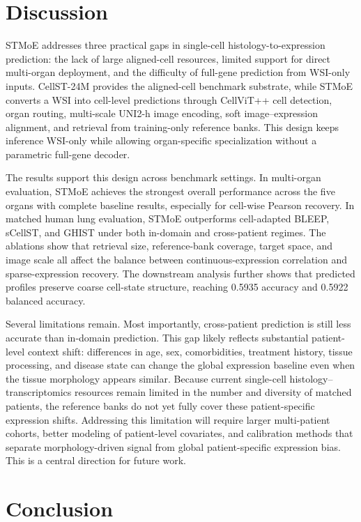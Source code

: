\documentclass[sigconf]{acmart}
\newcommand{\method}{STMoE\xspace}
\begin{document}
\section{Discussion}

\method{} addresses three practical gaps in single-cell histology-to-expression prediction: the lack of large aligned-cell resources, limited support for direct multi-organ deployment, and the difficulty of full-gene prediction from WSI-only inputs. CellST-24M provides the aligned-cell benchmark substrate, while \method{} converts a WSI into cell-level predictions through CellViT++ cell detection, organ routing, multi-scale UNI2-h image encoding, soft image--expression alignment, and retrieval from training-only reference banks. This design keeps inference WSI-only while allowing organ-specific specialization without a parametric full-gene decoder.

The results support this design across benchmark settings. In multi-organ evaluation, \method{} achieves the strongest overall performance across the five organs with complete baseline results, especially for cell-wise Pearson recovery. In matched human lung evaluation, \method{} outperforms cell-adapted BLEEP, sCellST, and GHIST under both in-domain and cross-patient regimes. The ablations show that retrieval size, reference-bank coverage, target space, and image scale all affect the balance between continuous-expression correlation and sparse-expression recovery. The downstream analysis further shows that predicted profiles preserve coarse cell-state structure, reaching 0.5935 accuracy and 0.5922 balanced accuracy.

Several limitations remain. Most importantly, cross-patient prediction is still less accurate than in-domain prediction. This gap likely reflects substantial patient-level context shift: differences in age, sex, comorbidities, treatment history, tissue processing, and disease state can change the global expression baseline even when the tissue morphology appears similar. Because current single-cell histology--transcriptomics resources remain limited in the number and diversity of matched patients, the reference banks do not yet fully cover these patient-specific expression shifts. Addressing this limitation will require larger multi-patient cohorts, better modeling of patient-level covariates, and calibration methods that separate morphology-driven signal from global patient-specific expression bias. This is a central direction for future work.

\section{Conclusion}
\end{document}
